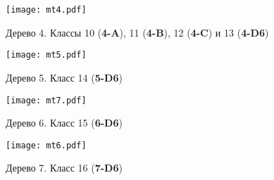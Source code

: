 \begin{figure}[H]
    \centering
    \texttt{[image: mt4.pdf]}
    \vspace{0.5cm}\vfill
    \hfill
    \vspace{0.3cm}\vfill
    \hfill
    \caption{Дерево 4. Классы 10 ({\bf 4-A}), 11 ({\bf 4-B}), 12 ({\bf 4-C}) и 13 ({\bf 4-D6})}
    \label{fig:tree4}
\end{figure}

\begin{figure}[H]
    \centering
    \texttt{[image: mt5.pdf]}
    \hfill
    \caption{Дерево 5. Класс 14 ({\bf 5-D6})}
    \label{fig:tree5}
\end{figure}

\begin{figure}[H]
    \centering
    \texttt{[image: mt7.pdf]}
    \hfill
    \caption{Дерево 6. Класс 15 ({\bf 6-D6})}
    \label{fig:tree6}
\end{figure}

\begin{figure}[H]
    \centering
    \texttt{[image: mt6.pdf]}
    \hfill
    \caption{Дерево 7. Класс 16 ({\bf 7-D6})}
    \label{fig:tree7}
\end{figure}
